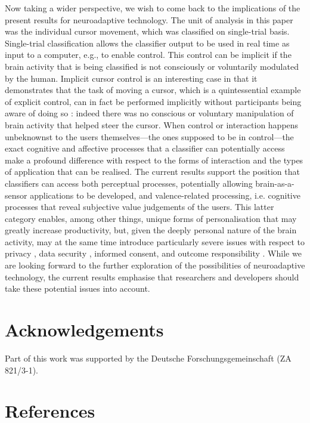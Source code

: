 Now taking a wider perspective, we wish to come back to the implications of the present results for neuroadaptive technology. The unit of analysis in this paper was the individual cursor movement, which was classified on single-trial basis. Single-trial classification allows the classifier output to be used in real time as input to a computer, e.g., to enable control. This control can be implicit if the brain activity that is being classified is not consciously or voluntarily modulated by the human. Implicit cursor control is an interesting case in that it demonstrates that the task of moving a cursor, which is a quintessential example of explicit control, can in fact be performed implicitly without participants being aware of doing so \cite{zander2014implicit,zander2016nat}: indeed there was no conscious or voluntary manipulation of brain activity that helped steer the cursor. When control or interaction happens unbeknownst to the users themselves---the ones supposed to be in control---the exact cognitive and affective processes that a classifier can potentially access make a profound difference with respect to the forms of interaction and the types of application that can be realised. The current results support the position that classifiers can access both perceptual processes, potentially allowing brain-as-a-sensor applications to be developed, and valence-related processing, i.e. cognitive processes that reveal subjective value judgements of the users. This latter category enables, among other things, unique forms of personalisation that may greatly increase productivity, but, given the deeply personal nature of the brain activity, may at the same time introduce particularly severe issues with respect to privacy \cite{mecacci2019criteria}, data security \cite{fairclough2014confidential}, informed consent, and outcome responsibility \cite{krol2020cognitiveprobing}. While we are looking forward to the further exploration of the possibilities of neuroadaptive technology, the current results emphasise that researchers and developers should take these potential issues into account. 


\section*{Acknowledgements}

Part of this work was supported by the Deutsche Forschungsgemeinschaft (ZA 821/3-1). 


\section*{References}


